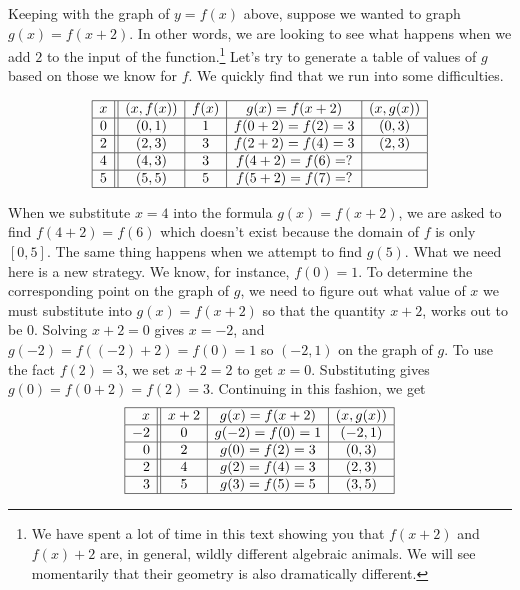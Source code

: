 \smallskip

Keeping with the graph of $y=f(x)$ above, suppose we wanted to graph $g(x) = f(x+2)$.  In other words, we are looking to see what happens when we add $2$ to the input of the function.\footnote{We have spent a lot of time in this text showing you that $f(x+2)$ and $f(x)+2$ are, in general, wildly different algebraic animals.   We will see momentarily that their geometry is also dramatically different.}  Let's try to generate a table of values of $g$ based on those we know for $f$.  We quickly find that we run into some difficulties.

\[ \begin{array}{|c||c|c|c|c|}  

\hline

x & (x,f(x)) & f(x)& g(x)=f(x+2) & (x, g(x)) \\ \hline
0  & (0,1)& 1 & f(0+2) = f(2) = 3   &(0, 3) \\  \hline
2 & (2,3) & 3 & f(2+2) = f(4) = 3  &(2,3) \\  \hline
4 & (4,3) & 3 &  f(4+2) = f(6) = ? &  \\  \hline
5 & (5,5) & 5 & f(5+2) = f(7) = ?  &  \\  \hline

\end{array} \] 

When we substitute $x=4$ into the formula $g(x)=f(x+2)$, we are asked to find $f(4+2)=f(6)$ which doesn't exist because the domain of $f$ is only $[0,5]$.  The same thing happens when we attempt to find $g(5)$.  What we need here is a new strategy.  We know, for instance, $f(0) = 1$.  To determine the corresponding point on the graph of $g$, we need to figure out what value of $x$ we must substitute into $g(x) = f(x+2)$ so that the quantity $x+2$, works out to be $0$.  Solving $x+2=0$ gives $x=-2$, and $g(-2) = f((-2)+2) = f(0) = 1$ so  $(-2,1)$ on the graph of $g$.  To use the fact $f(2) = 3$, we set $x+2 = 2$ to get $x=0$. Substituting gives $g(0) = f(0+2) = f(2) = 3$.  Continuing in this fashion, we get  \[ \begin{array}{|r||c|c|c|}  

\hline

x & x+2 & g(x)=f(x+2) & (x, g(x)) \\ \hline
-2 & 0 & g(-2)=f(0) = 1   &(-2, 1) \\  \hline
0 &  2 &  g(0)=f(2) = 3  &(0,3) \\  \hline
2 & 4  & g(2)=f(4) = 3 &  (2,3)\\  \hline
3 & 5 & g(3)=f(5) = 5  & (3,5) \\  \hline

\end{array} \] 

